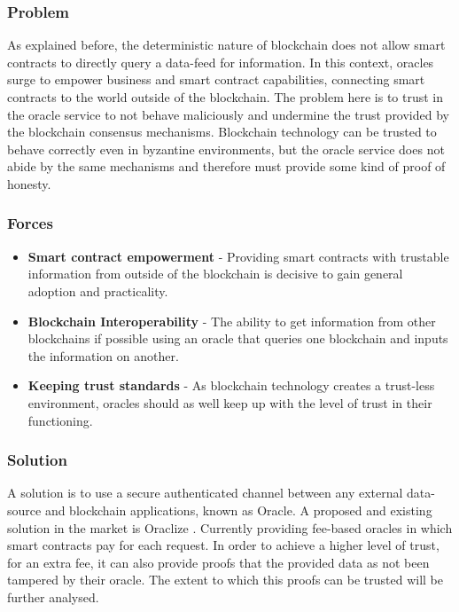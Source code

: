 \subsubsection{Problem}
As explained before, the deterministic nature of blockchain does not allow smart contracts to directly query a data-feed for information. In this context, oracles surge to empower business and smart contract capabilities, connecting smart contracts to the world outside of the blockchain. The problem here is to trust in the oracle service to not behave maliciously and undermine the trust provided by the blockchain consensus mechanisms. Blockchain technology can be trusted to behave correctly even in byzantine environments, but the oracle service does not abide by the same mechanisms and therefore must provide some kind of proof of honesty.

\subsubsection{Forces}
\begin{itemize}
\item \textbf{Smart contract empowerment} - Providing smart contracts with trustable information from outside of the blockchain is decisive to gain general adoption and practicality.
\item \textbf{Blockchain Interoperability} - The ability to get information from other blockchains if possible using an oracle that queries one blockchain and inputs the information on another.
\item \textbf{Keeping trust standards} - As blockchain technology creates a trust-less environment, oracles should as well keep up with the level of trust in their functioning.
\end{itemize}


\subsubsection{Solution}
A solution is to use a secure authenticated channel between any external data-source and blockchain applications, known as Oracle. A proposed and existing solution in the market is Oraclize  \cite{Oraclize.it2018OraclizeDocumentation}. Currently providing fee-based oracles in which smart contracts pay for each request. In order to achieve a higher level of trust, for an extra fee, it can also provide proofs that the provided data as not been tampered by their oracle. The extent to which this proofs can be trusted will be further analysed. 

